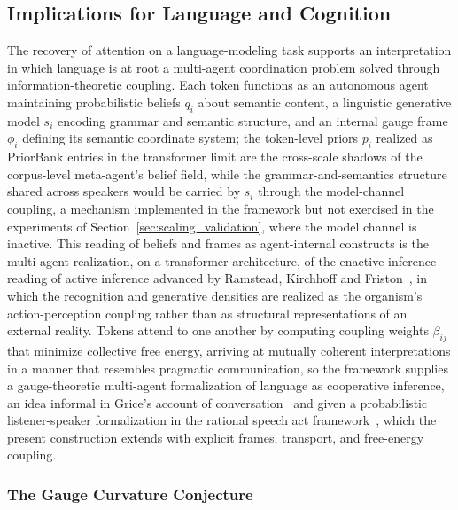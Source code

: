 \documentclass[11pt]{article}
\begin{document}
\subsection{Implications for Language and Cognition}

The recovery of attention on a language-modeling task supports an interpretation in which language is at root a multi-agent coordination problem solved through information-theoretic coupling. Each token functions as an autonomous agent maintaining probabilistic beliefs $q_i$ about semantic content, a linguistic generative model $s_i$ encoding grammar and semantic structure, and an internal gauge frame $\phi_i$ defining its semantic coordinate system; the token-level priors $p_i$ realized as PriorBank entries in the transformer limit are the cross-scale shadows of the corpus-level meta-agent's belief field, while the grammar-and-semantics structure shared across speakers would be carried by $s_i$ through the model-channel coupling, a mechanism implemented in the framework but not exercised in the experiments of Section~\ref{sec:scaling_validation}, where the model channel is inactive. This reading of beliefs and frames as agent-internal constructs is the multi-agent realization, on a transformer architecture, of the enactive-inference reading of active inference advanced by Ramstead, Kirchhoff and Friston~\cite{Ramstead2019}, in which the recognition and generative densities are realized as the organism's action-perception coupling rather than as structural representations of an external reality. Tokens attend to one another by computing coupling weights $\beta_{ij}$ that minimize collective free energy, arriving at mutually coherent interpretations in a manner that resembles pragmatic communication, so the framework supplies a gauge-theoretic multi-agent formalization of language as cooperative inference, an idea informal in Grice's account of conversation~\cite{Grice1975} and given a probabilistic listener-speaker formalization in the rational speech act framework~\cite{FrankGoodman2012}, which the present construction extends with explicit frames, transport, and free-energy coupling.

\subsubsection{The Gauge Curvature Conjecture}
\label{sec:gauge_curvature_conjecture}
\end{document}
